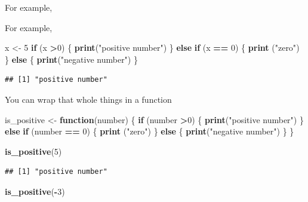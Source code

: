 \documentclass[
]{book}
\newenvironment{Shaded}{\begin{snugshade}}{\end{snugshade}}
\newcommand{\ControlFlowTok}[1]{\textcolor[rgb]{0.13,0.29,0.53}{\textbf{#1}}}
\newcommand{\DecValTok}[1]{\textcolor[rgb]{0.00,0.00,0.81}{#1}}
\newcommand{\KeywordTok}[1]{\textcolor[rgb]{0.13,0.29,0.53}{\textbf{#1}}}
\newcommand{\NormalTok}[1]{#1}
\newcommand{\OperatorTok}[1]{\textcolor[rgb]{0.81,0.36,0.00}{\textbf{#1}}}
\newcommand{\StringTok}[1]{\textcolor[rgb]{0.31,0.60,0.02}{#1}}
\theoremstyle{definition}
\theoremstyle{definition}
\theoremstyle{definition}
\theoremstyle{definition}
\theoremstyle{remark}
\begin{document}
For example,

For example,

\begin{Shaded}
\begin{Highlighting}[]
\NormalTok{x <-}\StringTok{ }\DecValTok{5}
\ControlFlowTok{if}\NormalTok{ (x }\OperatorTok{>}\DecValTok{0}\NormalTok{) \{}
  \KeywordTok{print}\NormalTok{(}\StringTok{"positive number"}\NormalTok{)}
\NormalTok{\} }\ControlFlowTok{else} \ControlFlowTok{if}\NormalTok{ (x }\OperatorTok{==}\StringTok{ }\DecValTok{0}\NormalTok{)  \{}
  \KeywordTok{print}\NormalTok{ (}\StringTok{"zero"}\NormalTok{)}
\NormalTok{\} }\ControlFlowTok{else}\NormalTok{ \{}
  \KeywordTok{print}\NormalTok{(}\StringTok{"negative number"}\NormalTok{)}
\NormalTok{\}}
\end{Highlighting}
\end{Shaded}

\begin{verbatim}
## [1] "positive number"
\end{verbatim}

You can wrap that whole things in a function

\begin{Shaded}
\begin{Highlighting}[]
\NormalTok{is_positive <-}\StringTok{ }\ControlFlowTok{function}\NormalTok{(number) \{}
  \ControlFlowTok{if}\NormalTok{ (number }\OperatorTok{>}\DecValTok{0}\NormalTok{) \{}
    \KeywordTok{print}\NormalTok{(}\StringTok{"positive number"}\NormalTok{)}
\NormalTok{  \} }\ControlFlowTok{else} \ControlFlowTok{if}\NormalTok{ (number }\OperatorTok{==}\StringTok{ }\DecValTok{0}\NormalTok{)  \{}
    \KeywordTok{print}\NormalTok{ (}\StringTok{"zero"}\NormalTok{)}
\NormalTok{  \} }\ControlFlowTok{else}\NormalTok{ \{}
    \KeywordTok{print}\NormalTok{(}\StringTok{"negative number"}\NormalTok{)}
\NormalTok{  \}}
\NormalTok{\}}

\KeywordTok{is_positive}\NormalTok{(}\DecValTok{5}\NormalTok{)}
\end{Highlighting}
\end{Shaded}

\begin{verbatim}
## [1] "positive number"
\end{verbatim}

\begin{Shaded}
\begin{Highlighting}[]
\KeywordTok{is_positive}\NormalTok{(}\OperatorTok{-}\DecValTok{3}\NormalTok{)}
\end{Highlighting}
\end{Shaded}
\end{document}
